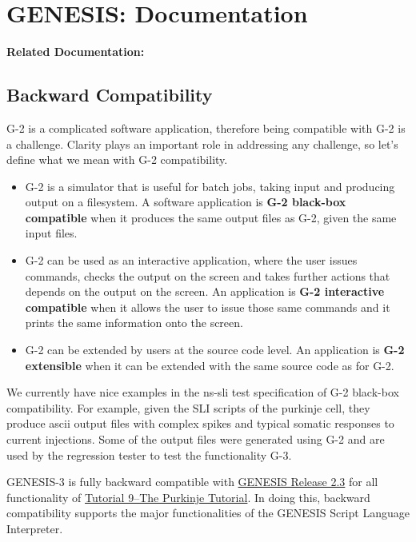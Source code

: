 \documentclass[12pt]{article}
\begin{document}
\section*{GENESIS: Documentation}

{\bf Related Documentation:}

\subsection*{Backward Compatibility}

G-2 is a complicated software application, therefore being compatible
with G-2 is a challenge.  Clarity plays an important role in addressing
any challenge, so let's define what we mean with G-2 compatibility.

\begin{itemize}
\item G-2 is a simulator that is useful for batch jobs, taking input
  and producing output on a filesystem.  A software application is
  {\bf G-2 black-box compatible} when it produces the same output
  files as G-2, given the same input files.
\item G-2 can be used as an interactive application, where the user
  issues commands, checks the output on the screen and takes further
  actions that depends on the output on the screen.  An application is
  {\bf G-2 interactive compatible} when it allows the user to issue
  those same commands and it prints the same information onto the
  screen.
\item G-2 can be extended by users at the source code level.  An
  application is {\bf G-2 extensible} when it can be extended with the
  same source code as for G-2.
\end{itemize}


We currently have nice examples in the ns-sli test specification of
G-2 black-box compatibility.  For example, given the SLI scripts of
the purkinje cell, they produce ascii output files with complex spikes
and typical somatic responses to current injections.  Some of the
output files were generated using G-2 and are used by the regression
tester to test the functionality G-3.


GENESIS-3 is fully backward compatible with
\href{http://genesis-sim.org/GENESIS/genesis-ftp/}{GENESIS Release
  2.3} for all functionality of
\href{http://genesis-sim.org/GENESIS/illtuts/purkinje.html}{Tutorial
  9--The Purkinje Tutorial}. In doing this, backward compatibility
supports the major functionalities of the GENESIS Script Language
Interpreter.
\end{document}

